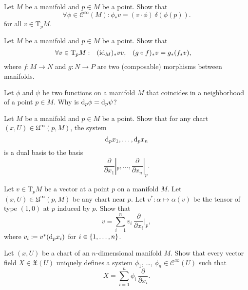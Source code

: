 \begin{xca}
  Let $M$ be a manifold and $p \in M$ be a point. Show that
  \[
    \forall \phi \in \mathcal C^\infty(M):
    \phi_* v = (v \cdot \phi) \, \delta(\phi(p)).
  \]
  for all $v \in \mathrm T_p M$.
\end{xca}

\begin{xca}
  Let $M$ be a manifold and $p \in M$ be a point. Show that
  \[
    \begin{aligned}
      \forall v \in \mathrm T_p M: &&
      (\mathrm{id}_M)_* v & v, &
      (g \circ f)_* v & = g_* (f_* v),
    \end{aligned}
  \]
  where $f\colon M \to N$ and $g\colon N \to P$ are two (composable) morphisms
  between manifolds.
\end{xca}

\begin{xca}
  Let $\phi$ and $\psi$ be two functions on a manifold $M$
  that coincides in a neighborhood of a point $p \in M$. Why is
  $\mathrm d_p \phi = \mathrm d_p \psi$?  
\end{xca}

\begin{xca}
  Let $M$ be a manifold and $p \in M$ be a point. Show that for any chart
  $(x, U) \in \mathfrak U^\infty(p, M)$, the system
  \[
    \mathrm d_p x_1, \dotsc, \mathrm d_p x_n
  \]
  is a dual basis to the basis
  \[
    \frac{\partial}{\partial x_1}|_p,
    \dotsc, \frac{\partial}{\partial x_n}|_p.
  \]
\end{xca}

\begin{xca}
  Let $v \in \mathrm T_p M$ be a vector at a point $p$ on a manifold $M$. Let
  $(x, U) \in \mathfrak U^\infty(p, M)$ be any chart near $p$. Let
  $v^*\colon \alpha \mapsto \alpha(v)$ be the tensor of type $(1, 0)$ at $p$
  induced by $p$.
  Show that
  \[
    v = \sum_{i = 1}^n v_i \, \frac{\partial}{\partial x_i}|_p,
  \]
  where $v_i \coloneqq v^*(\mathrm d_p x_i)$ for $i \in \lbrace1, \dotsc, n\rbrace$.
\end{xca}

\begin{xca}
  Let $(x, U)$ be a chart of an $n$-dimensional manifold $M$. Show that every
  vector field $X \in \mathfrak X(U)$ uniquely defines a system $\phi_1$, \dots,
  $\phi_n \in \mathcal C^\infty(U)$ such that
  \[
    X = \sum_{i = 1}^n \phi_i \, \frac{\partial}{\partial x_i}.
  \]
\end{xca}
